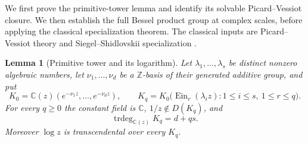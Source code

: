 \documentclass[11pt]{article}
\newtheorem{lemma}[theorem]{Lemma}
\theoremstyle{definition}
\theoremstyle{remark}
\newcommand{\Ein}{\operatorname{Ein}}
\begin{document}
We first prove the primitive-tower lemma and identify its solvable
Picard--Vessiot closure. We then establish the full Bessel product
group at complex scales, before applying the classical specialization
theorem. The classical inputs are Picard--Vessiot theory and
Siegel--Shidlovskii specialization \cite{Kolchin,Beukers}.

\begin{lemma}[Primitive tower and its logarithm]\label{pj:primitive}
Let $\lambda_1,\ldots,\lambda_s$ be distinct nonzero algebraic numbers,
let $\nu_1,\ldots,\nu_d$ be a $\mathbb Z$-basis of their generated
additive group, and put
\[
 K_0=\mathbb C(z)(e^{-\nu_1z},\ldots,e^{-\nu_dz}),\qquad
 K_q=K_0\bigl(\Ein_r(\lambda_i z):1\le i\le s,\ 1\le r\le q\bigr).
\]
For every $q\ge0$ the constant field is $\mathbb C$,
$1/z\notin D(K_q)$, and
\[
 \operatorname{trdeg}_{\mathbb C(z)}K_q=d+qs.
\]
Moreover $\log z$ is transcendental over every $K_q$.
\end{lemma}
\end{document}
